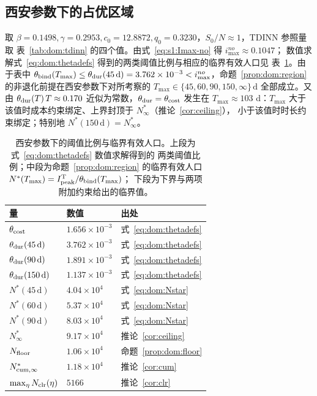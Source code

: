 \documentclass[lang=cn,a4paper,newtx]{elegantpaper}
\numberwithin{equation}{section}
\theoremstyle{plain}
\begin{document}
\subsection{西安参数下的占优区域}
\label{sec:dom:xian}

取 $\beta=0.1498,\gamma=0.2953,c_0=12.8872,q_0=0.3230$，$S_0/N\approx1$，TDINN 参照量取
表~\ref{tab:dom:tdinn} 的四个值。由式~\eqref{eq:s1:Imax-no} 得 $i_{\max}^{no}\approx0.1047$；
数值求解式~\eqref{eq:dom:thetadefs} 得到的两类阈值比例与相应的临界有效人口见
表~\ref{tab:dom:thresholds}。由于表中 $\theta_{\rm bind}(T_{\max})\le\theta_{\rm dur}(45\,\mathrm d)
=3.762\times10^{-3}<i_{\max}^{no}$，命题~\ref{prop:dom:region} 的非退化前提在西安参数下对所考察的
$T_{\max}\in\{45,60,90,150,\infty\}\,\mathrm d$ 全部成立。又由 $\theta_{\rm dur}(T)\,T\approx0.170$
近似为常数，$\theta_{\rm dur}=\theta_{\rm cost}$ 发生在 $T_{\max}\approx103$ d：$T_{\max}$
大于该值时成本约束绑定、上界封顶于 $N^\ast_\infty$（推论~\ref{cor:ceiling}），
小于该值时时长约束绑定；特别地 $N^\ast(150\,\mathrm d)=N^\ast_\infty$。

\begin{table}[htbp]
  \centering
  \footnotesize
  \caption{西安参数下的阈值比例与临界有效人口。上段为式~\eqref{eq:dom:thetadefs} 数值求解得到的
  两类阈值比例；中段为命题~\ref{prop:dom:region} 的临界有效人口
  $N^\ast(T_{\max})=I_{\rm peak}^{\rm T}/\theta_{\rm bind}(T_{\max})$；
  下段为下界与两项附加约束给出的临界值。}
  \label{tab:dom:thresholds}
  \begin{tabular}{lll}
    \toprule
    量 & 数值 & 出处 \\
    \midrule
    $\theta_{\rm cost}$ & $1.656\times10^{-3}$ & 式~\eqref{eq:dom:thetadefs} \\
    $\theta_{\rm dur}(45\,\mathrm d)$ & $3.762\times10^{-3}$ & 式~\eqref{eq:dom:thetadefs} \\
    $\theta_{\rm dur}(90\,\mathrm d)$ & $1.891\times10^{-3}$ & 式~\eqref{eq:dom:thetadefs} \\
    $\theta_{\rm dur}(150\,\mathrm d)$ & $1.137\times10^{-3}$ & 式~\eqref{eq:dom:thetadefs} \\
    \midrule
    $N^\ast(45\,\mathrm d)$ & $4.04\times10^{4}$ & 式~\eqref{eq:dom:Nstar} \\
    $N^\ast(60\,\mathrm d)$ & $5.37\times10^{4}$ & 式~\eqref{eq:dom:Nstar} \\
    $N^\ast(90\,\mathrm d)$ & $8.03\times10^{4}$ & 式~\eqref{eq:dom:Nstar} \\
    $N^\ast_\infty$ & $9.17\times10^{4}$ & 推论~\ref{cor:ceiling} \\
    \midrule
    $N_{\rm floor}$ & $1.06\times10^{4}$ & 命题~\ref{prop:dom:floor} \\
    $N_{\rm cum,\infty}^\ast$ & $1.18\times10^{4}$ & 推论~\ref{cor:cum} \\
    $\max_\eta N_{\rm clr}(\eta)$ & $5166$ & 推论~\ref{cor:clr} \\
    \bottomrule
  \end{tabular}
\end{table}
\end{document}
